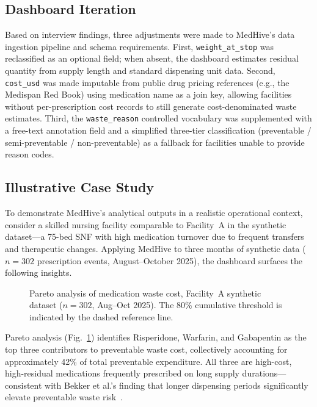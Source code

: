 \documentclass[letterpaper, 10pt, conference]{IEEEconf}
\begin{document}
\subsection{Dashboard Iteration}

Based on interview findings, three adjustments were made to MedHive's data
ingestion pipeline and schema requirements.
First, \texttt{weight\_at\_stop} was reclassified as an optional field;
when absent, the dashboard estimates residual quantity from supply length and
standard dispensing unit data.
Second, \texttt{cost\_usd} was made imput\-able from public drug pricing
references (e.g., the Medispan Red Book) using medication name as a join key,
allowing facilities without per-prescription cost records to still generate
cost-denominated waste estimates.
Third, the \texttt{waste\_reason} controlled vocabulary was supplemented with
a free-text annotation field and a simplified three-tier classification
(preventable / semi-preventable / non-preventable) as a fallback for facilities
unable to provide reason codes.

\subsection{Illustrative Case Study}

To demonstrate MedHive's analytical outputs in a realistic operational
context, consider a skilled nursing facility comparable to Facility~A in the
synthetic dataset---a 75-bed SNF with high medication turnover due to frequent
transfers and therapeutic changes.
Applying MedHive to three months of synthetic data ($n = 302$ prescription
events, August--October 2025), the dashboard surfaces the following insights.

\begin{figure}[h]
\centering
{}
\caption{Pareto analysis of medication waste cost, Facility~A synthetic
dataset ($n=302$, Aug--Oct 2025). The 80\% cumulative threshold is indicated
by the dashed reference line.}
\label{fig:pareto}
\end{figure}

Pareto analysis (Fig.~\ref{fig:pareto}) identifies Risperidone, Warfarin, and
Gabapentin as the top three contributors to preventable waste cost,
collectively accounting for approximately 42\% of total preventable expenditure.
All three are high-cost, high-residual medications frequently prescribed on
long supply durations---consistent with Bekker et al.'s finding that longer
dispensing periods significantly elevate preventable waste
risk~\cite{Bekker2018Patient}.
\end{document}
